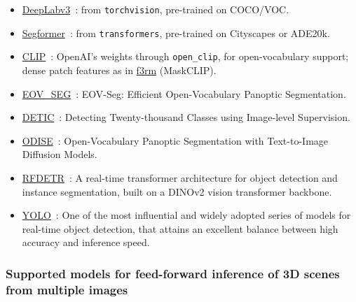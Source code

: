 \documentclass{article}
\providecommand{\tightlist}{%
  \setlength{\itemsep}{0pt}\setlength{\parskip}{0pt}}
\begin{document}
\begin{itemize}
\tightlist
\item
  \href{https://arxiv.org/abs/1706.05587}{DeepLabv3}~\cite{chen2017rethinking}: from \texttt{torchvision}, pre-trained on COCO/VOC.
\item
  \href{https://arxiv.org/abs/2105.15203}{Segformer}~\cite{xie2021segformer}: from \texttt{transformers}, pre-trained on Cityscapes or ADE20k.
\item
  \href{https://arxiv.org/abs/2212.09506}{CLIP}~\cite{lin2023clip}: OpenAI's weights through \texttt{open\_clip}, for open-vocabulary support; dense patch features as in \href{https://github.com/f3rm/f3rm}{f3rm} (MaskCLIP).
\item
  \href{https://arxiv.org/abs/2412.08628v1}{EOV\_SEG}~\cite{eov_seg}: EOV-Seg: Efficient Open-Vocabulary Panoptic Segmentation.
\item
  \href{https://arxiv.org/abs/2201.02605}{DETIC}~\cite{detic}: Detecting Twenty-thousand Classes using Image-level Supervision.
\item
  \href{https://arxiv.org/abs/2303.04803}{ODISE}~\cite{odise}: Open-Vocabulary Panoptic Segmentation with Text-to-Image Diffusion Models.
\item
  \href{https://arxiv.org/abs/2511.09554}{RFDETR}~\cite{rfdetr}: A real-time transformer architecture for object detection and instance segmentation, built on a DINOv2 vision transformer backbone.
\item
  \href{https://arxiv.org/abs/2510.09653}{YOLO}~\cite{sapkota2025ultralytics}: One of the most influential and widely adopted series of models for real-time object detection, that attains an excellent balance
between high accuracy and inference speed.
\end{itemize}
\hypertarget{supported-models-for-feed-forward-inference-of-3d-scenes-from-multiple-images}{%
\subsubsection{Supported models for feed-forward inference of 3D scenes
from multiple
images}\label{supported-models-for-feed-forward-inference-of-3d-scenes-from-multiple-images}}
\end{document}
